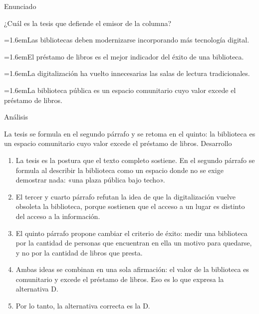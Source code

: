 \documentclass[10pt,a4paper,twocolumn]{article}
\newcommand{\alternativa}[2]{\par\noindent\hangindent=1.6em\hangafter=1\makebox[1.6em][l]{\tecla{#1}}#2\par}
\newcommand{\clave}[1]{\par\smallskip{\sffamily\footnotesize\color{esmeralda} Clave \teclaok{#1}}\par}
\begin{document}
\begin{ejemplo}
{\sffamily\footnotesize\color{zinc500} Enunciado}\par
¿Cuál es la tesis que defiende el emisor de la columna?
\alternativa{A}{Las bibliotecas deben modernizarse incorporando más tecnología digital.}
\alternativa{B}{El préstamo de libros es el mejor indicador del éxito de una biblioteca.}
\alternativa{C}{La digitalización ha vuelto innecesarias las salas de lectura tradicionales.}
\alternativa{D}{La biblioteca pública es un espacio comunitario cuyo valor excede el préstamo de libros.}
\clave{D}
{\sffamily\footnotesize\color{zinc500} Análisis}\par La tesis se formula en el segundo párrafo y se retoma en el quinto: la biblioteca es un espacio comunitario cuyo valor excede el préstamo de libros.
{\sffamily\footnotesize\color{zinc500} Desarrollo}
\begin{enumerate}
  \item La tesis es la postura que el texto completo sostiene. En el segundo párrafo se formula al describir la biblioteca como un espacio donde no se exige demostrar nada: «una plaza pública bajo techo».
  \item El tercer y cuarto párrafo refutan la idea de que la digitalización vuelve obsoleta la biblioteca, porque sostienen que el acceso a un lugar es distinto del acceso a la información.
  \item El quinto párrafo propone cambiar el criterio de éxito: medir una biblioteca por la cantidad de personas que encuentran en ella un motivo para quedarse, y no por la cantidad de libros que presta.
  \item Ambas ideas se combinan en una sola afirmación: el valor de la biblioteca es comunitario y excede el préstamo de libros. Eso es lo que expresa la alternativa D.
  \item Por lo tanto, la alternativa correcta es la D.
\end{enumerate}
\end{ejemplo}
\end{document}
